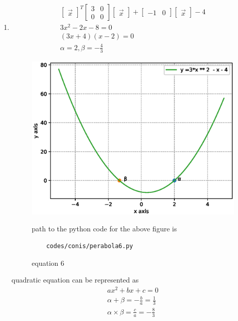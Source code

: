\begin{enumerate}[label=\arabic*.,ref=\thesubsection.\theenumi]
\item
\begin{align}
\begin{bmatrix}\vec x\end{bmatrix}^T\begin{bmatrix}3 & 0\\0 & 0\end{bmatrix}\begin{bmatrix}\vec x\end{bmatrix} + \begin{bmatrix}-1 & 0\end{bmatrix}\begin{bmatrix}\vec x\end{bmatrix} -4
\\
3x^2-2x-8 = 0
\\
\left(3x + 4\right)\left(x -2\right) = 0
\\
\alpha = 2,\beta =-\frac{4}{3}
\end{align}

\begin{figure}[!ht]
	\centering
	\includegraphics[width=\columnwidth]{./figures/conics/perabola6.eps}
	\caption{equation 6 }
	\label{fig:perabola6}
	path to the python code for the above figure is 
	\begin{lstlisting}
	codes/conis/perabola6.py
	\end{lstlisting}
\end{figure}

quadratic equation can be represented as 
\begin{align}
ax^2+bx +c = 0
\\
\alpha +\beta = -\frac{b}{a} = \frac{1}{3}
\\
\alpha \times \beta = \frac{c}{a} = -\frac{8}{3}
\end{align}

\end{enumerate}
